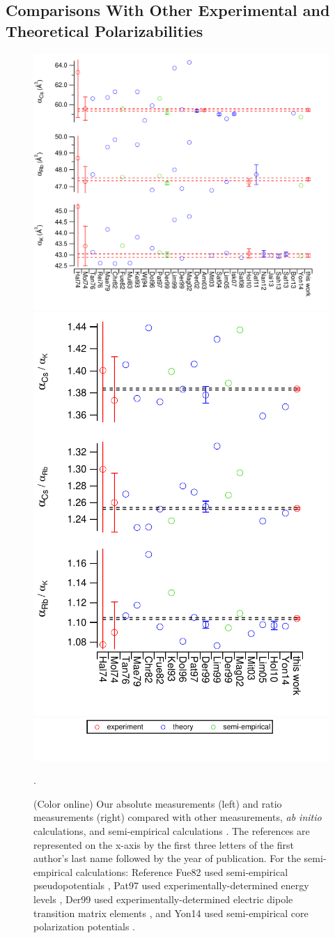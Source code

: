 \documentclass[twocolumn,prl,showpacs,superscriptaddress]{revtex4-1}   %
\begin{document}
\subsection{Comparisons With Other Experimental and Theoretical Polarizabilities}

\begin{figure}
\includegraphics[width=0.60\linewidth,keepaspectratio]{displayAbsComps.pdf}
\includegraphics[width=0.38\linewidth,keepaspectratio]{displayRatComps.pdf}
\includegraphics[width=0.55\linewidth,keepaspectratio]{displayCompsLegend.pdf}
\caption{\label{comparisons}(Color online) Our absolute measurements (left) and ratio measurements (right) compared with other measurements, \textit{ab initio} calculations, and semi-empirical calculations 
\cite{Molof1974,Hall1974,Tang1976,Reinsch1976,Kutzelnigg1978,
Christiansen1982,Fuentealba1999,Muller1984,Kello1993,VanWijngaarden1994,
Dolg1996,Patil1997,Derevianko1998,Magnier2002,Derevianko2001,
Amini2003,Mitroy2003,Safronova2004,Lim2005,Safronova2008,
Holmgren2010,Safronova2011,Nandy2012,Jiang2013,Sahoo2013,
Safronova2013,Borschevsky2013,Y.-B.2014}.
The references are represented on the x-axis by the first three letters of the first author's last name followed by the year of publication. For the semi-empirical calculations: Reference Fue82 used semi-empirical pseudopotentials \cite{Fuentealba1999}, Pat97 used experimentally-determined energy levels \cite{Patil1997}, Der99 used experimentally-determined electric dipole transition matrix elements \cite{Derevianko1998}, and Yon14 used semi-empirical core polarization potentials \cite{Y.-B.2014}.}.
\end{figure}
\end{document}
